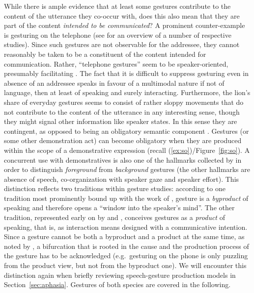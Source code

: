 \documentclass[output=paper]{langsci/langscibook}
\begin{document}
While there is ample evidence that at least some gestures contribute to the content of the utterance they co-occur with, does this also mean that they are part of the content \emph{intended to be communicated}?
%
A prominent counter-example is gesturing on the telephone (see \citealt{Bavelas:Gerwing:Sutton:Prevost:2008} for an overview of a number of respective studies).
%
Since such gestures are not observable for the addressee, they cannot reasonably be taken to be a constituent of the content intended for communication.
%
Rather, \enquote{telephone gestures} seem to be speaker-oriented, presumably facilitating .
%
The fact that it is difficult to suppress gesturing even in absence of an addressee speaks in favour of a multimodal nature if not of language, then at least of speaking and surely interacting.
%
Furthermore, the lion's share of everyday gestures seems to consist of rather sloppy movements that do not contribute to the content of the utterance in any interesting sense, though they might signal other information like speaker states.
%
In this sense they are contingent, as opposed to being an obligatory  semantic component \citep{Luecking:2013:a}.
%
Gestures (or some other demonstration act) can become obligatory when they are produced within the scope of a demonstrative expression (recall (\ref{ex:so})/Figure~\ref{fig:so}).
%
A concurrent use with demonstratives is also one of the hallmarks collected by \citet{Cooperrider:2017} in order to distinguish \emph{foreground}  from \emph{background}  gestures (the other hallmarks are absence of speech, co-organization with speaker gaze and speaker effort).
%
This distinction reflects two traditions within gesture studies: according to one tradition most prominently bound up with the work of \citet{McNeill:1992}, gesture is a \emph{byproduct}  of speaking and therefore opens a \enquote{window into the speaker's mind}.
%
The other tradition, represented early on by \citet{Goodwin:2003} and \citet{Clark:1996}, conceives gestures as a \emph{product}  of speaking, that is, as interaction means designed with a communicative intention.
%
Since a gesture cannot be both a byproduct and a product at the same time, as noted by \citet{Cooperrider:2017}, a bifurcation that is rooted in the cause and the production process of the gesture has to be acknowledged (e.g.\ gesturing on the phone is only puzzling from the product view, but not from the byproduct one). 
%
We will encounter this distinction again when briefly reviewing speech-gesture production models in Section~\ref{sec:aphasia}.
%
Gestures of both species are covered in the following.
\end{document}
